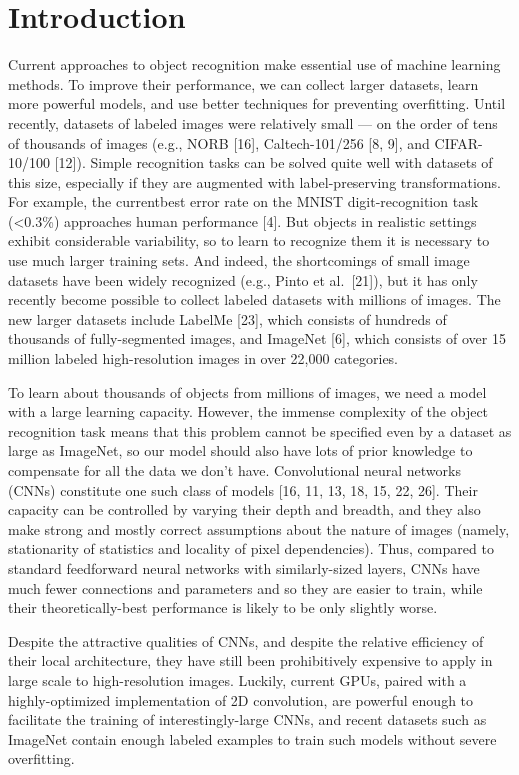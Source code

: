 \documentclass[12pt,a4paper,UTF8,twoside]{book}
\begin{document}
\hypertarget{introduction}{%
\section{Introduction}\label{introduction}}

Current approaches to object recognition make essential use of machine learning methods. To improve their performance, we can collect larger datasets, learn more powerful models, and use better techniques for preventing overfitting. Until recently, datasets of labeled images were relatively small --- on the order of tens of thousands of images (e.g., NORB {[}16{]}, Caltech-101/256 {[}8, 9{]}, and CIFAR-10/100 {[}12{]}). Simple recognition tasks can be solved quite well with datasets of this size, especially if they are augmented with label-preserving transformations. For example, the currentbest error rate on the MNIST digit-recognition task (\textless0.3\%) approaches human performance {[}4{]}. But objects in realistic settings exhibit considerable variability, so to learn to recognize them it is necessary to use much larger training sets. And indeed, the shortcomings of small image datasets have been widely recognized (e.g., Pinto et al.~{[}21{]}), but it has only recently become possible to collect labeled datasets with millions of images. The new larger datasets include LabelMe {[}23{]}, which consists of hundreds of thousands of fully-segmented images, and ImageNet {[}6{]}, which consists of over 15 million labeled high-resolution images in over 22,000 categories.

To learn about thousands of objects from millions of images, we need a model with a large learning capacity. However, the immense complexity of the object recognition task means that this problem cannot be specified even by a dataset as large as ImageNet, so our model should also have lots of prior knowledge to compensate for all the data we don't have. Convolutional neural networks (CNNs) constitute one such class of models {[}16, 11, 13, 18, 15, 22, 26{]}. Their capacity can be controlled by varying their depth and breadth, and they also make strong and mostly correct assumptions about the nature of images (namely, stationarity of statistics and locality of pixel dependencies). Thus, compared to standard feedforward neural networks with similarly-sized layers, CNNs have much fewer connections and parameters and so they are easier to train, while their theoretically-best performance is likely to be only slightly worse.

Despite the attractive qualities of CNNs, and despite the relative efficiency of their local architecture, they have still been prohibitively expensive to apply in large scale to high-resolution images. Luckily, current GPUs, paired with a highly-optimized implementation of 2D convolution, are powerful enough to facilitate the training of interestingly-large CNNs, and recent datasets such as ImageNet contain enough labeled examples to train such models without severe overfitting.
\end{document}
